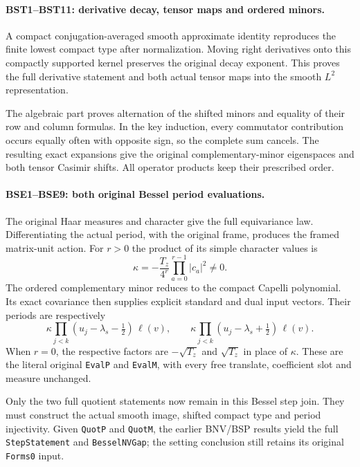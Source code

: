 \documentclass[11pt,a4paper]{article}
\numberwithin{equation}{section}
\theoremstyle{remark}\newtheorem{remark}[theorem]{Remark}
\begin{document}
\paragraph{BST1--BST11: derivative decay, tensor maps and ordered minors.}
A compact conjugation-averaged smooth approximate identity reproduces
the finite lowest compact type after normalization. Moving right
derivatives onto this compactly supported kernel preserves the
original decay exponent. This proves the full derivative statement
and both actual tensor maps into the smooth $L^2$ representation.

The algebraic part proves alternation of the shifted minors and
equality of their row and column formulas. In the key induction,
every commutator contribution occurs equally often with opposite
sign, so the complete sum cancels. The resulting exact expansions
give the original complementary-minor eigenspaces and both tensor
Casimir shifts. All operator products keep their prescribed order.

\paragraph{BSE1--BSE9: both original Bessel period evaluations.}
The original Haar measures and character give the full equivariance
law. Differentiating the actual period, with the original frame,
produces the framed matrix-unit action. For $r>0$ the product of
its simple character values is
\[
 \kappa=-\frac{T_z}{4^r}\prod_{a=0}^{r-1}|c_a|^2\ne0.
\]
The ordered complementary minor reduces to the compact Capelli
polynomial. Its exact covariance then supplies explicit standard
and dual input vectors. Their periods are respectively
\[
 \kappa\prod_{j<k}(u_j-\lambda_s-\tfrac12)\,\ell(v),
 \qquad
 \kappa\prod_{j<k}(u_j-\lambda_s+\tfrac12)\,\ell(v).
\]
When $r=0$, the respective factors are
$-\sqrt{T_z}$ and $\sqrt{T_z}$ in place of $\kappa$.
These are the literal original \texttt{Eval\allowbreak P} and \texttt{Eval\allowbreak M},
with every free translate, coefficient slot and measure unchanged.

Only the two full quotient statements now remain in this Bessel
step join. They must construct the actual smooth image, shifted
compact type and period injectivity. Given \texttt{Quot\allowbreak P} and
\texttt{Quot\allowbreak M}, the earlier BNV/BSP results yield the full
\texttt{Step\allowbreak Statement} and \texttt{Bessel\allowbreak NVGap}; the setting
conclusion still retains its original \texttt{Forms0} input.
\end{document}
